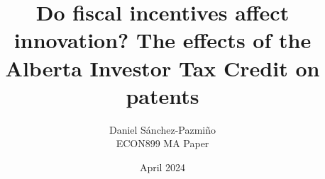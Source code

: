 \documentclass[12pt, a4paper]{article}
\title{Do fiscal incentives affect innovation? The effects of the Alberta Investor Tax Credit on patents}
\author{Daniel Sánchez-Pazmiño \\[1ex] ECON899 MA Paper}
\affil{Simon Fraser University}
\date{April 2024}
\renewenvironment{abstract}
 {\small
  \begin{center}
  \vspace{-1em}\vspace{0pt}
  \end{center}
  \quotation\itshape}
 {\endquotation}
\begin{document}

\maketitle

\begin{abstract}
    \lipsum[1]
\end{abstract}



\end{document}
